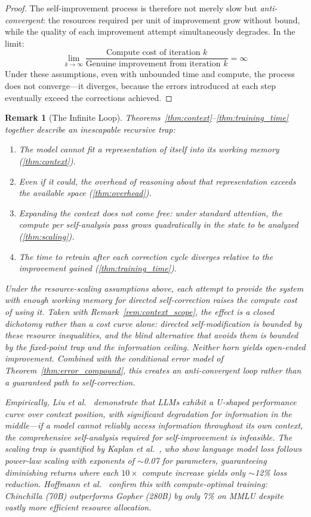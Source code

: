 \documentclass[11pt,a4paper]{article}
\newtheorem{remark}[theorem]{Remark}
\begin{document}
\begin{proof}
The self-improvement process is therefore not merely slow but \emph{anti-convergent}: the resources required per unit of improvement grow without bound, while the quality of each improvement attempt simultaneously degrades. In the limit:
\begin{equation}
\lim_{k \to \infty} \frac{\text{Compute cost of iteration } k}{\text{Genuine improvement from iteration } k} = \infty
\end{equation}
Under these assumptions, even with unbounded time and compute, the process does not converge---it diverges, because the errors introduced at each step eventually exceed the corrections achieved.
\end{proof}

\begin{remark}[The Infinite Loop]
Theorems~\ref{thm:context}--\ref{thm:training_time} together describe an inescapable recursive trap:
\begin{enumerate}
    \item The model cannot fit a representation of itself into its working memory (\ref{thm:context}).
    \item Even if it could, the overhead of reasoning about that representation exceeds the available space (\ref{thm:overhead}).
    \item Expanding the context does not come free: under standard attention, the compute per self-analysis pass grows quadratically in the state to be analyzed (\ref{thm:scaling}).
    \item The time to retrain after each correction cycle diverges relative to the improvement gained (\ref{thm:training_time}).
\end{enumerate}
Under the resource-scaling assumptions above, each attempt to provide the system with enough working memory for directed self-correction raises the compute cost of using it. Taken with Remark~\ref{rem:context_scope}, the effect is a closed dichotomy rather than a cost curve alone: directed self-modification is bounded by these resource inequalities, and the blind alternative that avoids them is bounded by the fixed-point trap and the information ceiling. Neither horn yields open-ended improvement. Combined with the conditional error model of Theorem~\ref{thm:error_compound}, this creates an anti-convergent loop rather than a guaranteed path to self-correction.

Empirically, Liu et al.~\cite{liu2023lost} demonstrate that LLMs exhibit a U-shaped performance curve over context position, with significant degradation for information in the middle---if a model cannot reliably access information throughout its own context, the comprehensive self-analysis required for self-improvement is infeasible. The scaling trap is quantified by Kaplan et al.~\cite{kaplan2020scaling}, who show language model loss follows power-law scaling with exponents of $\sim$0.07 for parameters, guaranteeing diminishing returns where each $10\times$ compute increase yields only $\sim$12\% loss reduction. Hoffmann et al.~\cite{hoffmann2022chinchilla} confirm this with compute-optimal training: Chinchilla (70B) outperforms Gopher (280B) by only 7\% on MMLU despite vastly more efficient resource allocation.
\end{remark}
\end{document}
